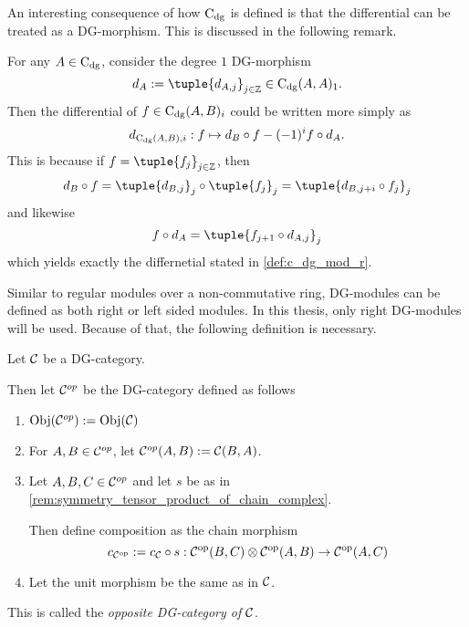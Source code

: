 An interesting consequence of how \( \operatorname{C}_{\operatorname{dg}} \) is defined is that the differential can be treated as a DG-morphism. This is discussed in the following remark.
\begin{remark}
    \label{rem:c_dg_differential}
    For any \( A \in \operatorname{C}_{\operatorname{dg}} \), consider the degree \( 1 \) DG-morphism
    \[
        d_A := \tuple{ d_{A, j} }_{j \in \Zb} \in \C_{\dg}(A, A)_1.
    \]
    Then the differential of \( f \in \operatorname{C}_{\operatorname{dg}}(A, B)_i \) could be written more simply as
    \[
        d_{\operatorname{C}_{\operatorname{dg}}(A, B), i}: f \mapsto d_B \circ f - (-1)^i f \circ d_A.
    \]
    This is because if \( f = \tuple{f_j}_{j \in \Zb} \), then
    \[
        d_B \circ f = \tuple{d_{B, j} }_j \circ \tuple{ f_j }_j = \tuple{ d_{B, j + i} \circ f_j }_j
    \]
    and likewise
    \[
        f \circ d_A = \tuple{f_{j + 1} \circ d_{A, j}}_j
    \]
    which yields exactly the differnetial stated in \autoref{def:c_dg_mod_r}.
\end{remark}

Similar to regular modules over a non-commutative ring, DG-modules can be defined as both right or left sided modules. In this thesis, only right DG-modules will be used. Because of that, the following definition is necessary.

\begin{definition}
    \label{def:opposite_dg_category}
    Let \( {\mathcal{C}} \) be a DG-category.

    Then let \( {\mathcal{C}}^{op} \) be the DG-category defined as follows
    \begin{enumerate}
        \item {
            \( \operatorname{Obj}({\mathcal{C}}^{op}) := \operatorname{Obj}({\mathcal{C}}) \)
        }
        \item {
            For \( A, B \in {\mathcal{C}}^{op} \), let \( {\mathcal{C}}^{op}(A, B) := {\mathcal{C}}(B, A) \).
        }
        \item {
            Let \( A, B, C \in {\mathcal{C}}^{op} \) and let \( s \) be as in \autoref{rem:symmetry_tensor_product_of_chain_complex}.
            
            Then define composition as the chain morphism
            \[
                c_{{\mathcal{C}}^{\operatorname{op}}} :=  c_{{\mathcal{C}}} \circ s: {\mathcal{C}}^{\operatorname{op}} (B, C) \otimes {\mathcal{C}}^{\operatorname{op}} (A, B) \to {\mathcal{C}}^{\operatorname{op}} (A, C)
            \]
        }
        \item {
            Let the unit morphism be the same as in \( {\mathcal{C}} \).
        }
    \end{enumerate}
    This is called the \emph{opposite DG-category of \( {\mathcal{C}} \)}.
\end{definition}

